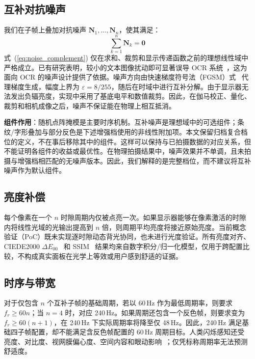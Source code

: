 \documentclass{ieeeaccess}
\begin{document}
\subsection{互补对抗噪声}

我们在子帧上叠加对抗噪声 $\mathbf{N}_1, \ldots, \mathbf{N}_n$，使其满足：
\begin{equation}
\sum_{k=1}^{n}\mathbf{N}_k = \mathbf{0}
\label{eq:noise_complement}
\end{equation}
式~(\ref{eq:noise_complement}) 仅在求和、裁剪和显示传递函数之前的理想线性域中严格成立。已有研究表明，较小的文本图像扰动即可显著误导 OCR 系统~\cite{b_song2018}，这为面向 OCR 的噪声设计提供了依据。噪声方向由快速梯度符号法（FGSM）式~\cite{b_goodfellow2015} 代理梯度生成，幅度上界为 $\varepsilon=8/255$，随后在时域中进行互补分解。由于显示器无法发出负辐亮度，实现中采用了基底电平和数值裁剪。因此，在伽马校正、量化、裁剪和相机成像之后，噪声不保证能在物理上相互抵消。

\textbf{组件作用}：随机点阵掩模是主要时序机制。互补噪声是理想域中的可选组件；条纹/字形叠加与部分反色是下述增强档使用的非线性附加项。本文保留归档复合档位的定义，不在事后移除其中的组件。这样可以保持与已拍摄数据的对应关系，但不能证明各组件的收益或最优性。在物理拍摄结果中，噪声效果并不单调，且未拍摄与增强档相匹配的无噪声版本。因此，我们解释的是完整档位，而不建议将互补噪声作为默认组件。

\subsection{亮度补偿}

每个像素在一个 $n$ 时隙周期内仅被点亮一次。如果显示器能够在像素激活的时隙内将线性光域的光输出提高到 $n$ 倍，则周期平均亮度将接近原始亮度。当前概念验证（PoC）既未实现逐时隙动态背光协同，也未进行光度验证。所有亮度对齐、CIEDE2000 $\Delta E_{00}$~\cite{b_ciede2000} 和 SSIM~\cite{b_wang2004} 结果均来自数字积分/归一化模型，仅用于跨配置比较，不构成真实面板在光学上等效或用户感到舒适的证据。

\subsection{时序与带宽}

对于仅包含 $n$ 个互补子帧的基础周期，若以 60\,Hz 作为最低周期率，则要求 $f_r\geq60n$；当 $n=4$ 时，对应 240\,Hz。如果周期还包含一个反色帧，则要求变为 $f_r\geq60(n+1)$，在 240\,Hz 下实际周期率将降至仅 48\,Hz。因此，240\,Hz 满足基础四子帧配置，却不能满足含反色帧配置的 60\,Hz 周期目标。人类闪烁感知还受亮度、对比度、视网膜偏心度、空间内容和眼动影响~\cite{b_cai2024,b_davis2015}；仅凭标称周期率无法预测舒适度。
\end{document}
